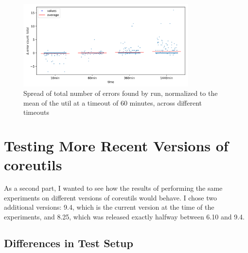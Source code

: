\documentclass{article}
\begin{document}
\begin{figure}[htbp]
    \centering
    \includegraphics[width=0.8\textwidth]{../plots/num_errors (total)/changes-by-time.png}
    \captionsetup{width=0.6\textwidth}
    \caption{Spread of total number of errors found by run, normalized to the mean of the util at a timeout of 60 minutes, across different timeouts}
    \label{fig:spread_across_times_errors}
\end{figure}

\section{Testing More Recent Versions of coreutils}
\label{SoftwareEvolution}

As a second part, I wanted to see how the results of performing the same experiments on different versions of coreutils would behave. I chose two additional versions: 9.4, which is the current version at the time of the experiments, and 8.25, which was released exactly halfway between 6.10 and 9.4.

\subsection{Differences in Test Setup}
\end{document}
